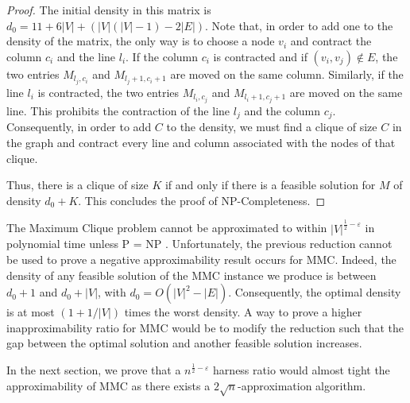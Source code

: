 \begin{proof}

%


The initial density in this matrix is $d_0 = 11 + 6|V| + (|V| (|V|-1) - 2|E|)$. Note that, in order to add one to the density of the matrix, the only way is to choose a node $v_i$ and contract the column $c_i$ and the line $l_i$. If the column $c_i$ is contracted and if $(v_i, v_j) \not \in E$, the two entries $M_{l_j,c_i}$ and $M_{l_j+1,c_i+1}$ are moved on the same column. Similarly, if the line $l_i$ is contracted, the two entries $M_{l_i,c_j}$ and $M_{l_i+1,c_j+1}$ are moved on the same line. This prohibits the contraction of the line $l_j$ and the column $c_j$. Consequently, in order to add $C$ to the density, we must find a clique of size $C$ in the graph and contract every line and column associated with the nodes of that clique.

Thus, there is a clique of size $K$ if and only if there is a feasible solution for $M$ of density $d_0 + K$. This concludes the proof of NP-Completeness.
\end{proof}
  
The Maximum Clique problem cannot be approximated to within $|V|^{\frac{1}{2} - \varepsilon}$ in polynomial time unless P = NP \cite{Hastad1999}. Unfortunately, the previous reduction cannot be used to prove a negative approximability result occurs for MMC. Indeed, the density of any feasible solution of the MMC instance we produce is between $d_0 + 1$ and $d_0 + |V|$, with $d_0 = O(|V|^2 - |E|)$. Consequently, the optimal density is at most $(1 + 1/|V|)$ times the worst density. A way to prove a higher inapproximability ratio for MMC would be to modify the reduction such that the gap between the optimal solution and another feasible solution increases.

In the next section, we prove that a $n^{\frac{1}{2} - \varepsilon}$ harness ratio would almost tight the approximability of MMC as there exists a $2\sqrt{n}$-approximation algorithm.
